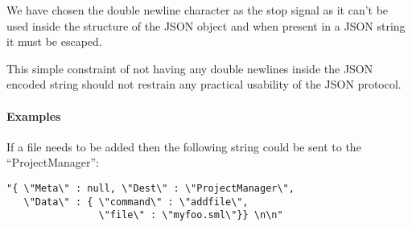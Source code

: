 We have chosen the double newline character as the stop signal as it can't be used
inside the structure of the JSON object and when present in a JSON string it
must be escaped. 

This simple constraint of not having any double newlines inside the JSON encoded
string should not restrain any practical usability of the JSON protocol.


\paragraph{Examples}

\begin{example} If a file needs to be added then the following string could be
  sent to the ``ProjectManager'':
\begin{verbatim}
"{ \"Meta\" : null, \"Dest\" : \"ProjectManager\",
   \"Data\" : { \"command\" : \"addfile\", 
                \"file\" : \"myfoo.sml\"}} \n\n"
\end{verbatim}
\end{example}


